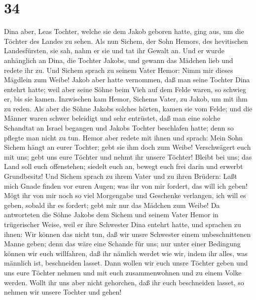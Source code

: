 \hypertarget{section-33}{%
\section{34}\label{section-33}}

 Dina aber, Leas Tochter, welche sie dem Jakob geboren
hatte, ging aus, um die Töchter des Landes zu sehen.  Als
nun Sichem, der Sohn Hemors, des hevitischen Landesfürsten, sie sah,
nahm er sie und tat ihr Gewalt an.  Und er wurde
anhänglich an Dina, die Tochter Jakobs, und gewann das Mädchen lieb und
redete ihr zu.  Und Sichem sprach zu seinem Vater Hemor:
Nimm mir dieses Mägdlein zum Weibe!  Jakob aber hatte
vernommen, daß man seine Tochter Dina entehrt hatte; weil aber seine
Söhne beim Vieh auf dem Felde waren, so schwieg er, bis sie kamen.
 Inzwischen kam Hemor, Sichems Vater, zu Jakob, um mit ihm
zu reden.  Als aber die Söhne Jakobs solches hörten, kamen
sie vom Felde; und die Männer waren schwer beleidigt und sehr entrüstet,
daß man eine solche Schandtat an Israel begangen und Jakobs Tochter
beschlafen hatte; denn so pflegte man nicht zu tun.  Hemor
aber redete mit ihnen und sprach: Mein Sohn Sichem hängt an eurer
Tochter; gebt sie ihm doch zum Weibe!  Verschwägert euch
mit uns; gebt uns eure Töchter und nehmt ihr unsere Töchter!
 Bleibt bei uns; das Land soll euch offenstehen; siedelt
euch an, bewegt euch frei darin und erwerbt Grundbesitz! 
Und Sichem sprach zu ihrem Vater und zu ihren Brüdern: Laßt mich Gnade
finden vor euren Augen; was ihr von mir fordert, das will ich geben!
 Mögt ihr von mir noch so viel Morgengabe und Geschenke
verlangen, ich will es geben, sobald ihr es fordert; gebt mir nur das
Mädchen zum Weibe!  Da antworteten die Söhne Jakobs dem
Sichem und seinem Vater Hemor in trügerischer Weise, weil er ihre
Schwester Dina entehrt hatte,  und sprachen zu ihnen: Wir
können das nicht tun, daß wir unsre Schwester einem unbeschnittenen
Manne geben; denn das wäre eine Schande für uns;  nur
unter einer Bedingung können wir euch willfahren, daß ihr nämlich werdet
wie wir, indem ihr alles, was männlich ist, beschneiden lasset.
 Dann wollen wir euch unsre Töchter geben und uns eure
Töchter nehmen und mit euch zusammenwohnen und zu einem Volke werden.
 Wollt ihr uns aber nicht gehorchen, daß ihr euch
beschneiden lasset, so nehmen wir unsere Tochter und gehen!
